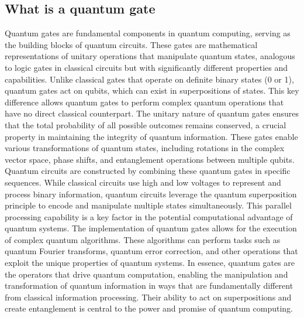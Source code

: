 \documentclass[12pt,oneside,a4paper]{article}
\begin{document}
\subsection{What is a quantum gate}
Quantum gates are fundamental components in quantum computing, serving as the building blocks of quantum circuits. These gates are mathematical representations of unitary operations that manipulate quantum states, analogous to logic gates in classical circuits but with significantly different properties and capabilities.
Unlike classical gates that operate on definite binary states (0 or 1), quantum gates act on qubits, which can exist in superpositions of states. This key difference allows quantum gates to perform complex quantum operations that have no direct classical counterpart.
The unitary nature of quantum gates ensures that the total probability of all possible outcomes remains conserved, a crucial property in maintaining the integrity of quantum information. These gates enable various transformations of quantum states, including rotations in the complex vector space, phase shifts, and entanglement operations between multiple qubits.
Quantum circuits are constructed by combining these quantum gates in specific sequences. While classical circuits use high and low voltages to represent and process binary information, quantum circuits leverage the quantum superposition principle to encode and manipulate multiple states simultaneously. This parallel processing capability is a key factor in the potential computational advantage of quantum systems.
The implementation of quantum gates allows for the execution of complex quantum algorithms. These algorithms can perform tasks such as quantum Fourier transforms, quantum error correction, and other operations that exploit the unique properties of quantum systems.
In essence, quantum gates are the operators that drive quantum computation, enabling the manipulation and transformation of quantum information in ways that are fundamentally different from classical information processing. Their ability to act on superpositions and create entanglement is central to the power and promise of quantum computing.
\end{document}
